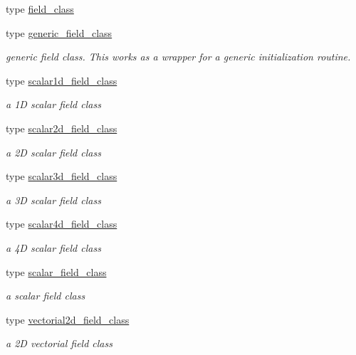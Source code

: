 \begin{DoxyCompactItemize}
\item 
type \mbox{\hyperlink{structfieldtypes__mod_1_1field__class}{field\+\_\+class}}
\item 
type \mbox{\hyperlink{structfieldtypes__mod_1_1generic__field__class}{generic\+\_\+field\+\_\+class}}
\begin{DoxyCompactList}\small\item\em generic field class. This works as a wrapper for a generic initialization routine. \end{DoxyCompactList}\item 
type \mbox{\hyperlink{structfieldtypes__mod_1_1scalar1d__field__class}{scalar1d\+\_\+field\+\_\+class}}
\begin{DoxyCompactList}\small\item\em a 1D scalar field class \end{DoxyCompactList}\item 
type \mbox{\hyperlink{structfieldtypes__mod_1_1scalar2d__field__class}{scalar2d\+\_\+field\+\_\+class}}
\begin{DoxyCompactList}\small\item\em a 2D scalar field class \end{DoxyCompactList}\item 
type \mbox{\hyperlink{structfieldtypes__mod_1_1scalar3d__field__class}{scalar3d\+\_\+field\+\_\+class}}
\begin{DoxyCompactList}\small\item\em a 3D scalar field class \end{DoxyCompactList}\item 
type \mbox{\hyperlink{structfieldtypes__mod_1_1scalar4d__field__class}{scalar4d\+\_\+field\+\_\+class}}
\begin{DoxyCompactList}\small\item\em a 4D scalar field class \end{DoxyCompactList}\item 
type \mbox{\hyperlink{structfieldtypes__mod_1_1scalar__field__class}{scalar\+\_\+field\+\_\+class}}
\begin{DoxyCompactList}\small\item\em a scalar field class \end{DoxyCompactList}\item 
type \mbox{\hyperlink{structfieldtypes__mod_1_1vectorial2d__field__class}{vectorial2d\+\_\+field\+\_\+class}}
\begin{DoxyCompactList}\small\item\em a 2D vectorial field class \end{DoxyCompactList}\item 

\end{DoxyCompactItemize}
